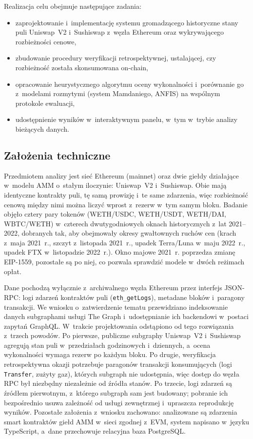 Realizacja celu obejmuje następujące zadania:
\begin{itemize}[nosep]
  \item zaprojektowanie i~implementację systemu gromadzącego historyczne stany puli Uniswap~V2
        i~Sushiswap z~węzła Ethereum oraz wykrywającego rozbieżności cenowe,
  \item zbudowanie procedury weryfikacji retrospektywnej, ustalającej, czy rozbieżność została
        skonsumowana on-chain,
  \item opracowanie heurystycznego algorytmu oceny wykonalności i~porównanie go z~modelami
        rozmytymi (system Mamdaniego, ANFIS) na wspólnym protokole ewaluacji,
  \item udostępnienie wyników w~interaktywnym panelu, w~tym w~trybie analizy bieżących danych.
\end{itemize}

\subsection{Założenia techniczne}

Przedmiotem analizy jest sieć Ethereum (mainnet) oraz dwie giełdy działające w~modelu AMM
o~stałym iloczynie: Uniswap~V2 i~Sushiswap. Obie mają identyczne kontrakty puli, tę samą
prowizję i~te same zdarzenia, więc rozbieżność cenową między nimi można liczyć wprost
z~rezerw w~tym samym bloku. Badanie objęło cztery pary tokenów (WETH/USDC, WETH/USDT,
WETH/DAI, WBTC/WETH) w~czterech dwutygodniowych oknach historycznych z~lat 2021--2022,
dobranych tak, aby obejmowały okresy gwałtownych ruchów cen (krach z~maja 2021~r., szczyt
z~listopada 2021~r., upadek Terra/Luna w~maju 2022~r., upadek FTX w~listopadzie 2022~r.).
Okno majowe 2021~r. poprzedza zmianę EIP-1559, pozostałe są po niej, co pozwala sprawdzić
modele w~dwóch reżimach opłat.

Dane pochodzą wyłącznie z~archiwalnego węzła Ethereum przez interfejs JSON-RPC: logi zdarzeń
kontraktów puli (\texttt{eth\_getLogs}), metadane bloków i~paragony transakcji. We wniosku
o~zatwierdzenie tematu przewidziano indeksowanie danych subgraphami usługi The Graph
i~udostępnianie ich backendowi w~postaci zapytań GraphQL. W~trakcie projektowania odstąpiono od
tego rozwiązania z~trzech powodów. Po pierwsze, publiczne subgraphy Uniswap~V2 i~Sushiswap
agregują stan puli w~przedziałach godzinowych i~dziennych, a~ocena wykonalności wymaga rezerw
po każdym bloku. Po drugie, weryfikacja retrospektywna okazji potrzebuje paragonów transakcji
konsumujących (logi \texttt{Transfer}, zużyty gaz), których subgraph nie udostępnia, więc
dostęp do węzła RPC był niezbędny niezależnie od źródła stanów. Po trzecie, logi zdarzeń są
źródłem pierwotnym, z~którego subgraph sam jest budowany; pobranie ich bezpośrednio usuwa
zależność od usługi zewnętrznej i~upraszcza reprodukcję wyników. Pozostałe założenia
z~wniosku zachowano: analizowane są zdarzenia smart kontraktów giełd AMM w~sieci zgodnej
z~EVM, system napisano w~języku TypeScript, a~dane przechowuje relacyjna baza PostgreSQL.

